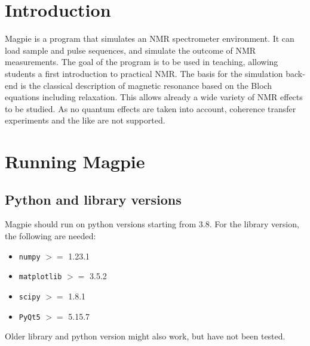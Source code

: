 \documentclass[11pt,a4paper]{article}
\renewcommand\cfttoctitlefont{\color{black!70}\Huge\fontfamily{SourceSansPro-LF}\bfseries}
\begin{document}


\thispagestyle{empty}
\newpage
\mbox{}


\renewcommand\cfttoctitlefont{\color{black}\Huge\fontfamily{SourceSansPro-LF}\bfseries}
\setcounter{tocdepth}{2}
\tableofcontents %

\renewcommand\cfttoctitlefont{\color{black!70}\Huge\fontfamily{SourceSansPro-LF}\bfseries}


\section{Introduction}
Magpie is a program that simulates an NMR spectrometer environment. It can load sample and pulse sequences, and simulate the outcome of NMR measurements. The goal of the program is to be used in teaching, allowing students a first introduction to practical NMR. The basis for the simulation back-end is the classical description of magnetic resonance based on the Bloch equations including relaxation. This allows already a wide variety of NMR effects to be studied. As no quantum effects are taken into account, coherence transfer experiments and the like are not supported.


\section{Running Magpie}
\subsection{Python and library versions}
Magpie should run on python
versions starting from 3.8.
For the library version, the following are needed:
\begin{itemize}
  \item  \texttt{numpy} $>=$ 1.23.1
  \item  \texttt{matplotlib} $>=$ 3.5.2
  \item  \texttt{scipy} $>=$ 1.8.1
  \item \texttt{PyQt5} $>=$ 5.15.7
\end{itemize}
Older library and python version might also work, but have not been tested.
\end{document}
